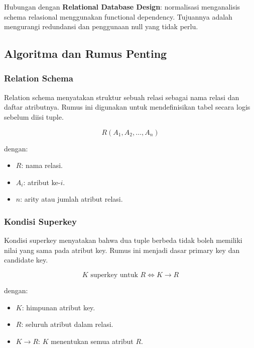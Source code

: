 Hubungan dengan \textbf{Relational Database Design}: normalisasi menganalisis schema relasional menggunakan functional dependency. Tujuannya adalah mengurangi redundansi dan penggunaan null yang tidak perlu.

\subsection{Algoritma dan Rumus Penting}

\subsubsection{Relation Schema}

\begin{jawab}
Relation schema menyatakan struktur sebuah relasi sebagai nama relasi dan daftar atributnya. Rumus ini digunakan untuk mendefinisikan tabel secara logis sebelum diisi tuple.
\end{jawab}

\begin{equation}
    R(A_1,A_2,\ldots,A_n)
    \label{eq:relation-schema-final}
\end{equation}

dengan:
\begin{itemize}
    \item \(R\): nama relasi.
    \item \(A_i\): atribut ke-\(i\).
    \item \(n\): arity atau jumlah atribut relasi.
\end{itemize}

\subsubsection{Kondisi Superkey}

\begin{jawab}
Kondisi superkey menyatakan bahwa dua tuple berbeda tidak boleh memiliki nilai yang sama pada atribut key. Rumus ini menjadi dasar primary key dan candidate key.
\end{jawab}

\begin{equation}
    K \text{ superkey untuk } R \iff K \rightarrow R
    \label{eq:key-fd}
\end{equation}

dengan:
\begin{itemize}
    \item \(K\): himpunan atribut key.
    \item \(R\): seluruh atribut dalam relasi.
    \item \(K \rightarrow R\): \(K\) menentukan semua atribut \(R\).
\end{itemize}
